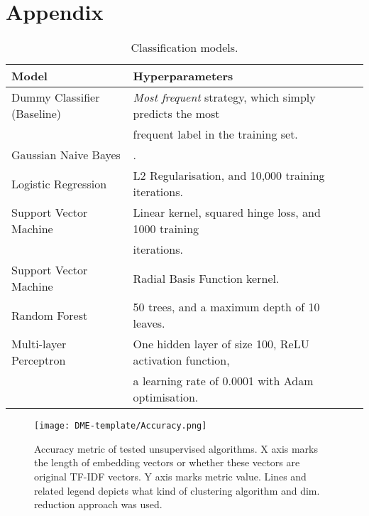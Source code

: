 \documentclass{article}
\begin{document}
\section*{Appendix}

\begin{table*}[h]
\caption{Classification models.} 
\label{tab:class-models}
\centering 

\begin{tabularx}{1.0\textwidth}{l p{9.0cm} X}
    \toprule
    Model & Hyperparameters \\
    \midrule 
    Dummy Classifier (Baseline) & \emph{Most frequent} strategy, which simply predicts the most \\ & frequent label in the training set. \\ 
    Gaussian Naive Bayes & . \\
    Logistic Regression & L2 Regularisation, and 10,000 training iterations. \\ 
    Support Vector Machine & Linear kernel, squared hinge loss, and 1000 training \\
    & iterations. \\ 
    Support Vector Machine & Radial Basis Function kernel. \\ 
    Random Forest & 50 trees, and a maximum depth of 10 leaves. \\ 
    Multi-layer Perceptron & One hidden layer of size 100, ReLU activation function, \\ 
    & a learning rate of 0.0001 with Adam optimisation. \\
    \bottomrule
\end{tabularx}
\end{table*}

\begin{figure}[p]
    \centering
    \texttt{[image: DME-template/Accuracy.png]}
    \caption{Accuracy metric of tested unsupervised algorithms. X axis marks the length of embedding vectors or whether these vectors are original TF-IDF vectors. Y axis marks metric value. Lines and related legend depicts what kind of clustering algorithm and dim. reduction approach was used. }
    \label{fig:usl-acc}
    \vspace{128in}
\end{figure}
\end{document}
